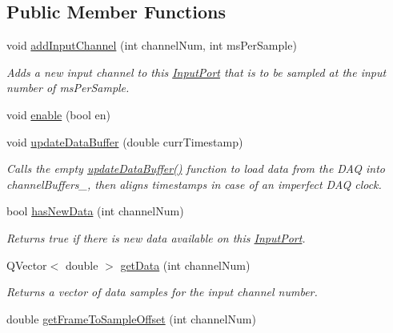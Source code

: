 \subsection*{Public Member Functions}
\begin{DoxyCompactItemize}
\item 
void \hyperlink{class_picto_1_1_input_port_ae49fa1de9c84fe7e836b7e4377395c85}{add\-Input\-Channel} (int channel\-Num, int ms\-Per\-Sample)
\begin{DoxyCompactList}\small\item\em Adds a new input channel to this \hyperlink{class_picto_1_1_input_port}{Input\-Port} that is to be sampled at the input number of ms\-Per\-Sample. \end{DoxyCompactList}\item 
void \hyperlink{class_picto_1_1_input_port_a38b518f5abf207187207da782e32302b}{enable} (bool en)
\item 
void \hyperlink{class_picto_1_1_input_port_aa0230b63e579442362a33b7aa0a6b3a1}{update\-Data\-Buffer} (double curr\-Timestamp)
\begin{DoxyCompactList}\small\item\em Calls the empty \hyperlink{class_picto_1_1_input_port_a885502b8712d339b918ac0c6ba418957}{update\-Data\-Buffer()} function to load data from the D\-A\-Q into channel\-Buffers\-\_\-, then aligns timestamps in case of an imperfect D\-A\-Q clock. \end{DoxyCompactList}\item 
\hypertarget{class_picto_1_1_input_port_a09c3cd9769baa2edc9591796bc52232f}{bool \hyperlink{class_picto_1_1_input_port_a09c3cd9769baa2edc9591796bc52232f}{has\-New\-Data} (int channel\-Num)}\label{class_picto_1_1_input_port_a09c3cd9769baa2edc9591796bc52232f}

\begin{DoxyCompactList}\small\item\em Returns true if there is new data available on this \hyperlink{class_picto_1_1_input_port}{Input\-Port}. \end{DoxyCompactList}\item 
Q\-Vector$<$ double $>$ \hyperlink{class_picto_1_1_input_port_a02a8fb8f8ef139a6387898ec5fa0fab7}{get\-Data} (int channel\-Num)
\begin{DoxyCompactList}\small\item\em Returns a vector of data samples for the input channel number. \end{DoxyCompactList}\item 
\hypertarget{class_picto_1_1_input_port_a4f084ee011ca2a5298f6a088f56ed6b7}{double \hyperlink{class_picto_1_1_input_port_a4f084ee011ca2a5298f6a088f56ed6b7}{get\-Frame\-To\-Sample\-Offset} (int channel\-Num)}\label{class_picto_1_1_input_port_a4f084ee011ca2a5298f6a088f56ed6b7}


\end{DoxyCompactItemize}
